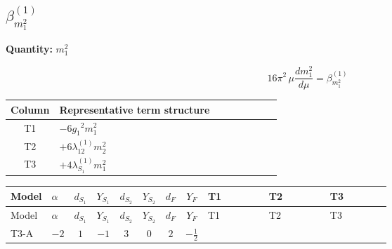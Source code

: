 \documentclass[8pt]{article}
\begin{document}
\begin{landscape}
\section*{$\beta_{m_1^2}^{(1)}$}
\noindent\textbf{Quantity: }$m_1^2$\par\smallskip
\[16\pi^2\,\mu\frac{d m_1^2}{d\mu}=\beta_{m_1^2}^{(1)}\]
\begin{center}
\begin{tabular}{@{}c >{\raggedright\arraybackslash}p{0.82\linewidth}@{}}
\toprule
Column & Representative term structure \\
\midrule
T1 & \(\displaystyle -6 {g_1}^2 {m_1^2}\) \\
\midrule
T2 & \(\displaystyle +6 {\lambda_{12}^{(1)}} {m_2^2}\) \\
\midrule
T3 & \(\displaystyle +4 {\lambda_{S_1}^{(1)}} {m_1^2}\) \\
\midrule
\bottomrule
\end{tabular}
\end{center}
\smallskip
\tiny
\begin{longtable}{@{}llcccccc >{\raggedright\arraybackslash}p{0.21\linewidth} >{\raggedright\arraybackslash}p{0.21\linewidth} >{\raggedright\arraybackslash}p{0.21\linewidth}@{}}
\toprule
Model & $\alpha$ & $d_{S_1}$ & $Y_{S_1}$ & $d_{S_2}$ & $Y_{S_2}$ & $d_F$ & $Y_F$ & T1 & T2 & T3 \\
\midrule
\endfirsthead
\toprule
Model & $\alpha$ & $d_{S_1}$ & $Y_{S_1}$ & $d_{S_2}$ & $Y_{S_2}$ & $d_F$ & $Y_F$ & T1 & T2 & T3 \\
\midrule
\endhead
T3-A & $-2$ & $1$ & $-1$ & $3$ & $0$ & $2$ & $-\frac{1}{2}$ & \scriptsize\adjustbox{max width=\linewidth}{$\begin{gathered} -6 {g_1}^2 {m_1^2}\end{gathered}$} & \scriptsize\adjustbox{max width=\linewidth}{$\begin{gathered} +6 {\lambda_{12}^{(1)}} {m_2^2}\end{gathered}$} & \scriptsize\adjustbox{max width=\linewidth}{$\begin{gathered} +4 {\lambda_{S_1}^{(1)}} {m_1^2}\end{gathered}$} \\
\midrule
\bottomrule
\end{longtable}
\clearpage

\end{landscape}
\end{document}
